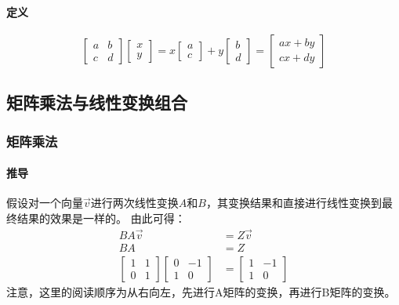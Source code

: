 \documentclass[UTF8]{ctexart}
\begin{document}
\paragraph{定义}
$$ \begin{bmatrix}
	a&b \\ c&d
\end{bmatrix} \begin{bmatrix}
	x \\ y
\end{bmatrix} = x \begin{bmatrix}
	a \\ c
\end{bmatrix} + y \begin{bmatrix}
	b \\ d
\end{bmatrix} = \begin{bmatrix}
	ax+by \\ cx+dy
\end{bmatrix}$$

\subsection{矩阵乘法与线性变换组合}
\subsubsection{矩阵乘法}
\paragraph{推导}
假设对一个向量$\overrightarrow{v}$进行两次线性变换$A$和$B$，其变换结果和直接进行线性变换到最终结果的效果是一样的。
由此可得：\begin{align*}
	BA\overrightarrow{v} &= Z\overrightarrow{v} \\
	BA &= Z \\
	\begin{bmatrix}
		1&1 \\ 0&1
	\end{bmatrix} \begin{bmatrix}
		0&-1 \\ 1&0
	\end{bmatrix} &= \begin{bmatrix}
		1&-1 \\ 1&0
	\end{bmatrix}
\end{align*}
注意，这里的阅读顺序为从右向左，先进行A矩阵的变换，再进行B矩阵的变换。
\end{document}

